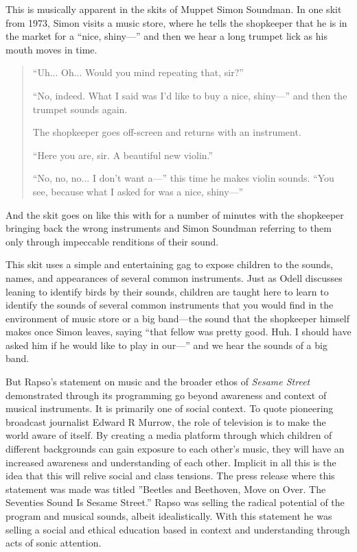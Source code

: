 \documentclass[12pt,letterpaper]{article}
\newcommand{\ses}{\textit{Sesame Street }}
\begin{document}
	This is musically apparent in the skits of Muppet Simon Soundman.
	In one skit from 1973,\autocite{0458} Simon visits a music store, where
	he tells the shopkeeper
	that he is in the market for a ``nice, shiny---'' and then we hear a
	long trumpet lick as his mouth moves in time. 

	\begin{quote}
	\ttfamily
	``Uh... Oh... Would you mind repeating that, sir?''

	``No, indeed. What I said was I'd like to buy a nice, shiny---'' and
	then the trumpet sounds again. 

	The shopkeeper goes off-screen and returns with an instrument. 
	 
	``Here you are, sir. A beautiful new violin.''

	``No, no, no... I don't want a---'' this time he makes violin
	sounds.  ``You see, because what I asked for was a nice, shiny---''
	
	\end{quote}
	
	And the skit goes on like this with for a number of minutes with the 
	shopkeeper bringing back the wrong instruments and Simon Soundman
	referring to them only through impeccable renditions of their sound. 
	
	This skit uses a simple and entertaining gag to expose children to the
	sounds, names, and appearances of several common instruments. Just as 
	Odell
	discusses leaning to identify birds by their sounds, children are	
	taught here to learn to identify the sounds of several common 
	instruments that you would find in the environment of music store or 
	a big band---the sound that the shopkeeper himself makes once Simon
	leaves, saying ``that fellow was pretty good. Huh. I should have asked
	him if he would like to play in our---'' and we hear the sounds of a
	big band.  

	But Rapso's statement on music and the broader ethos of \ses 
	demonstrated through its programming go beyond awareness and context of 
	musical instruments. It is primarily one of social context. To quote 
	pioneering broadcast journalist Edward R Murrow,
	the role of television is to make the world aware of
	itself.\autocite[49]{Davis} By creating a media platform through which 
	children of different backgrounds can gain exposure to each other's 
	music, they
	will have an increased awareness and understanding of each other.
	Implicit in all this is the idea that this will relive social and class
	tensions. The press release where this statement was made was titled 
	''Beetles and Beethoven, Move on Over. The Seventies Sound Is Sesame 
	Street.'' Rapso was selling the radical potential of the program and
	musical sounds, albeit idealistically. With this statement he was 
	selling a social and ethical education based in context and 
	understanding through acts of sonic attention. 
\end{document}
